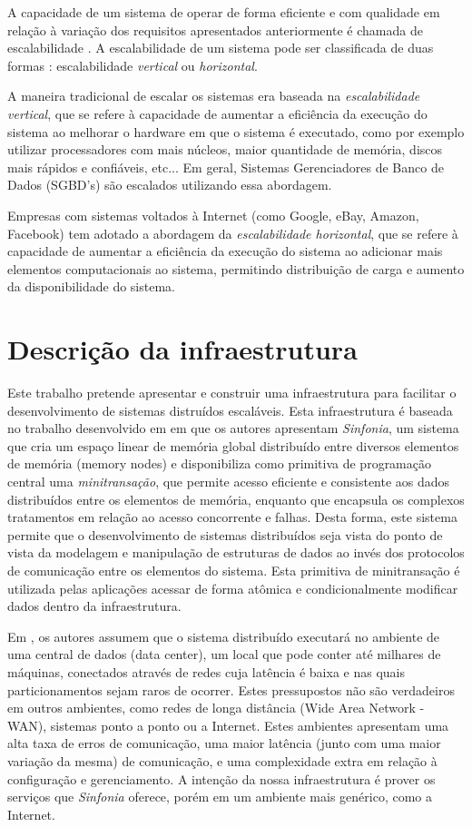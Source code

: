 \documentclass[11pt,twoside,a4paper]{book}
\begin{document}
A capacidade de um sistema de operar de forma eficiente e com qualidade em relação à variação dos requisitos apresentados anteriormente é chamada de escalabilidade \cite{evaluating-scalability}. A escalabilidade de um sistema pode ser classificada de duas formas \cite{scale-up-vs-down}: escalabilidade {\em vertical} ou {\em horizontal}.

A maneira tradicional de escalar os sistemas era baseada na {\em escalabilidade vertical}, que se refere à capacidade de aumentar a eficiência da execução do sistema ao melhorar o hardware em que o sistema é executado, como por exemplo utilizar processadores com mais núcleos, maior quantidade de memória, discos mais rápidos e confiáveis, etc... Em geral, Sistemas Gerenciadores de Banco de Dados (SGBD's) são escalados utilizando essa abordagem.

Empresas com sistemas voltados à Internet (como Google, eBay, Amazon, Facebook) tem adotado a abordagem da {\em escalabilidade horizontal}, que se refere à capacidade de aumentar a eficiência da execução do sistema ao adicionar mais elementos computacionais ao sistema, permitindo distribuição de carga e aumento da disponibilidade do sistema.

\chapter{Descrição da infraestrutura}
Este trabalho pretende apresentar e construir uma infraestrutura para facilitar o desenvolvimento de sistemas distruídos escaláveis. Esta infraestrutura é baseada no trabalho desenvolvido em \cite{sinfonia} em que os autores apresentam {\em Sinfonia}, um sistema que cria um espaço linear de memória global distribuído entre diversos elementos de memória (memory nodes) e disponibiliza como primitiva de programação central uma {\em minitransação}, que permite acesso eficiente e consistente aos dados distribuídos entre os elementos de memória, enquanto que encapsula os complexos tratamentos em relação ao acesso concorrente e falhas. Desta forma, este sistema permite que o desenvolvimento de sistemas distribuídos seja vista do ponto de vista da modelagem e manipulação de estruturas de dados ao invés dos protocolos de comunicação entre os elementos do sistema. Esta primitiva de minitransação é utilizada pelas aplicações acessar de forma atômica e condicionalmente modificar dados dentro da infraestrutura.

Em \cite{sinfonia}, os autores assumem que o sistema distribuído executará no ambiente de uma central de dados (data center), um local que pode conter até milhares de máquinas, conectados através de redes cuja latência é baixa e nas quais particionamentos sejam raros de ocorrer. Estes pressupostos não são verdadeiros em outros ambientes, como redes de longa distância (Wide Area Network - WAN), sistemas ponto a ponto ou a Internet. Estes ambientes apresentam uma alta taxa de erros de comunicação, uma maior latência (junto com uma maior variação da mesma) de comunicação, e uma complexidade extra em relação à configuração e gerenciamento. A intenção da nossa infraestrutura é prover os serviços que {\em Sinfonia} oferece, porém em um ambiente mais genérico, como a Internet. 
\end{document}
